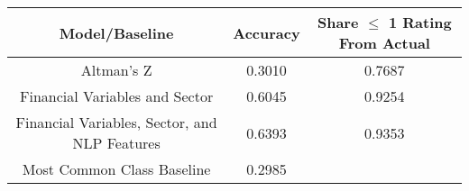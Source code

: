 \footnotesize
\begin{tabular}{ccc}
\toprule
Model/Baseline & Accuracy & Share $\le$ 1 Rating From Actual \\
\midrule
Altman's Z & 0.3010 & 0.7687 \\
Financial Variables and Sector & 0.6045 & 0.9254 \\
Financial Variables, Sector, and NLP Features & 0.6393 & 0.9353 \\
Most Common Class Baseline & 0.2985 &  \\
\bottomrule
\end{tabular}

\normalsize
